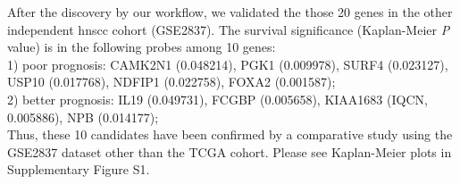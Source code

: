\documentclass[jpm,article,submit,moreauthors,pdftex]{Definitions/mdpi}
\begin{document}
After the discovery by our workflow, we validated the those 20 genes in the other independent \acrshort{hnscc} cohort (GSE2837).
The survival significance (Kaplan-Meier \textit{P} value) is in the following probes among 10 genes:\\
1) poor prognosis: CAMK2N1 (0.048214), PGK1 (0.009978), SURF4 (0.023127), USP10 (0.017768), NDFIP1 (0.022758), FOXA2 (0.001587);\\ %
2) better prognosis: IL19 (0.049731), FCGBP (0.005658), KIAA1683 (IQCN, 0.005886), NPB (0.014177);\\
Thus, these 10 candidates have been confirmed by a comparative study using the GSE2837 dataset other than the TCGA cohort. Please see Kaplan-Meier plots in Supplementary Figure S1.%
\end{document}
